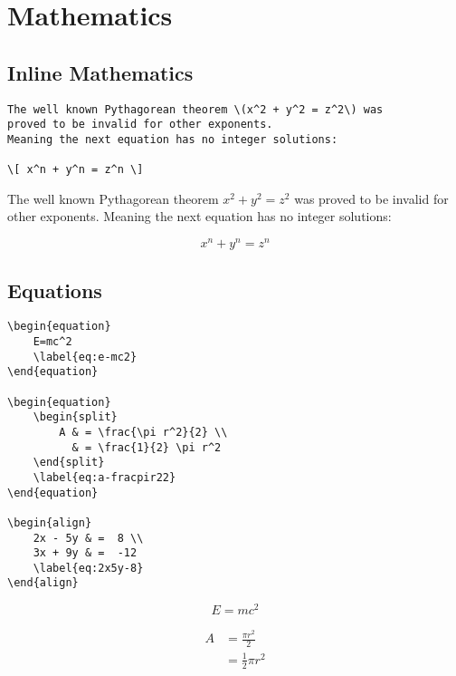 \section*{Mathematics}
\label{sec:mathematics}

\subsection*{Inline Mathematics}
\label{subsec:inline-mathematics}

\begin{lstlisting}[caption={Inline mathematics.}]
The well known Pythagorean theorem \(x^2 + y^2 = z^2\) was
proved to be invalid for other exponents.
Meaning the next equation has no integer solutions:

\[ x^n + y^n = z^n \]
\end{lstlisting}

The well known Pythagorean theorem \(x^2 + y^2 = z^2\) was
proved to be invalid for other exponents.
Meaning the next equation has no integer solutions:

\[x^n + y^n = z^n\]

\subsection*{Equations}
\label{subsec:equations}

\begin{lstlisting}[caption={Equations.}]
\begin{equation}
    E=mc^2
    \label{eq:e-mc2}
\end{equation}

\begin{equation}
    \begin{split}
        A & = \frac{\pi r^2}{2} \\
          & = \frac{1}{2} \pi r^2
    \end{split}
    \label{eq:a-fracpir22}
\end{equation}

\begin{align}
    2x - 5y & =  8 \\
    3x + 9y & =  -12
    \label{eq:2x5y-8}
\end{align}
\end{lstlisting}

\begin{equation}
    E=mc^2
    \label{eq:e-mc2}
\end{equation}

\begin{equation}
    \begin{split}
        A & = \frac{\pi r^2}{2} \\
          & = \frac{1}{2} \pi r^2
    \end{split}
    \label{eq:a-fracpir22}
\end{equation}


